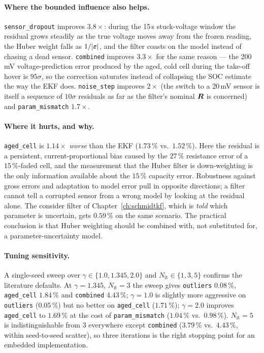 \paragraph{Where the bounded influence also helps.}  \texttt{sensor\_dropout} improves
$3.8\times$: during the 15\,s stuck-voltage window the residual grows steadily as the true voltage
moves away from the frozen reading, the Huber weight falls as $1/|\bm{\varepsilon}|$, and the filter coasts on
the model instead of chasing a dead sensor.  \texttt{combined} improves $3.3\times$ for the same
reason --- the 200\,mV voltage-prediction error produced by the aged, cold cell during the take-off
hover is $95\sigma$, so the correction saturates instead of collapsing the SOC estimate the way the
EKF does.  \texttt{noise\_step} improves $2\times$ (the switch to a 20\,mV sensor is itself a
sequence of $10\sigma$ residuals as far as the filter's nominal $\bm{R}$ is concerned) and
\texttt{param\_mismatch} $1.7\times$.

\paragraph{Where it hurts, and why.}  \texttt{aged\_cell} is $1.14\times$ \emph{worse} than the
EKF ($1.73\,\%$ vs.\ $1.52\,\%$).  Here the residual is a persistent, current-proportional bias
caused by the $27\,\%$ resistance error of a $15\,\%$-faded cell, and the measurement that the
Huber filter is down-weighting is the only information available about the $15\,\%$ capacity error.
Robustness against gross errors and adaptation to model error pull in opposite directions; a filter
cannot tell a corrupted sensor from a wrong model by looking at the residual alone.  The consider
filter of Chapter~\ref{ch:schmidtkf}, which is \emph{told} which parameter is uncertain, gets
$0.59\,\%$ on the same scenario.  The practical conclusion is that Huber weighting should be
combined with, not substituted for, a parameter-uncertainty model.

\paragraph{Tuning sensitivity.}  A single-seed sweep over $\gamma\in\{1.0,1.345,2.0\}$ and
$N_{\mathrm{it}}\in\{1,3,5\}$ confirms the literature defaults.  At $\gamma=1.345$,
$N_{\mathrm{it}}=3$ the sweep gives \texttt{outliers} $0.08\,\%$, \texttt{aged\_cell} $1.84\,\%$
and \texttt{combined} $4.43\,\%$; $\gamma=1.0$ is slightly more aggressive on \texttt{outliers}
($0.05\,\%$) but no better on \texttt{aged\_cell} ($1.71\,\%$); $\gamma=2.0$ improves
\texttt{aged\_cell} to $1.69\,\%$ at the cost of \texttt{param\_mismatch} ($1.04\,\%$ vs.\
$0.98\,\%$).  $N_{\mathrm{it}}=5$ is indistinguishable from $3$ everywhere except
\texttt{combined} ($3.79\,\%$ vs.\ $4.43\,\%$, within seed-to-seed scatter), so three iterations is
the right stopping point for an embedded implementation.

